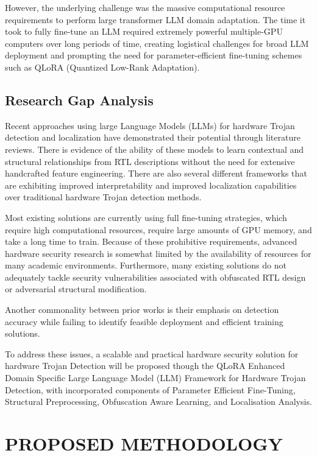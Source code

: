 \documentclass[12pt,a4paper]{report}
\begin{document}
However, the underlying challenge was the massive computational resource requirements to perform large transformer LLM domain adaptation. The time it took to fully fine-tune an LLM required extremely powerful multiple-GPU computers over long periods of time, creating logistical challenges for broad LLM deployment and prompting the need for parameter-efficient fine-tuning schemes such as QLoRA (Quantized Low-Rank Adaptation).

\section{Research Gap Analysis}

Recent approaches using large Language Models (LLMs) for hardware Trojan detection and localization have demonstrated their potential through literature reviews. There is evidence of the ability of these models to learn contextual and structural relationships from RTL descriptions without the need for extensive handcrafted feature engineering. There are also several different frameworks that are exhibiting improved interpretability and improved localization capabilities over traditional hardware Trojan detection methods.

Most existing solutions are currently using full fine-tuning strategies, which require high computational resources, require large amounts of GPU memory, and take a long time to train. Because of these prohibitive requirements, advanced hardware security research is somewhat limited by the availability of resources for many academic environments. Furthermore, many existing solutions do not adequately tackle security vulnerabilities associated with obfuscated RTL design or adversarial structural modification.

Another commonality between prior works is their emphasis on detection accuracy while failing to identify feasible deployment and efficient training solutions.

To address these issues, a scalable and practical hardware security solution for hardware Trojan Detection will be proposed though the QLoRA Enhanced Domain Specific Large Language Model (LLM) Framework for Hardware Trojan Detection, with incorporated components of Parameter Efficient Fine-Tuning, Structural Preprocessing, Obfuscation Aware Learning, and Localisation Analysis.



\chapter{PROPOSED METHODOLOGY}
\end{document}
